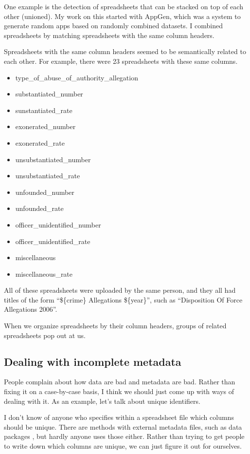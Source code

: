 \documentclass{acm_proc_article-sp}
\begin{document}
One example is the detection of spreadsheets that can be stacked on top of
each other (unioned).
My work on this started with AppGen,\cite{appgen} which was a system to
generate random apps based on randomly combined datasets. I combined spreadsheets
by matching spreadsheets with the same column headers.

Spreadsheets with the same column headers seemed to be semantically related to
each other. For example, there were 23 spreadsheets with these same columns.
\begin{itemize}
\item type\_of\_abuse\_of\_authority\_allegation
\item substantiated\_number
\item sunstantiated\_rate
\item exonerated\_number
\item exonerated\_rate
\item unsubstantiated\_number
\item unsubstantiated\_rate
\item unfounded\_number
\item unfounded\_rate
\item officer\_unidentified\_number
\item officer\_unidentified\_rate
\item miscellaneous
\item miscellaneous\_rate
\end{itemize}

All of these spreadsheets were uploaded by the same person, and they all had
titles of the form ``\$\{crime\} Allegations \$\{year\}'', such as
``Disposition Of Force Allegations 2006''.

When we organize spreadsheets by their column headers, groups of related
spreadsheets pop out at us.

\subsection{Dealing with incomplete metadata}
People complain about how data are bad and metadata are bad. Rather than
fixing it on a case-by-case basis, I think we should just come up with ways
of dealing with it. As an example, let's talk about unique identifiers.

I don't know of anyone who specifies within a spreadsheet file which columns
should be unique. There are methods with external metadata files, such as data
packages \cite{datapackages}, but hardly anyone uses those either. Rather than
trying to get people to write down which columns are unique, we can just figure
it out for ourselves.
\end{document}
